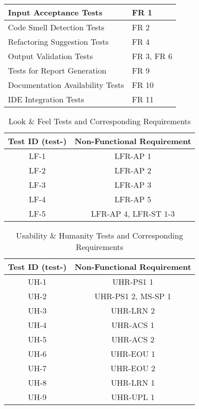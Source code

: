 \documentclass[12pt, titlepage]{article}
\begin{document}
\begin{enumerate}[label={\bf \textcolor{Maroon}{test-SRT-\arabic*}}, wide=0pt, font=\itshape]
\begin{table}[H]
\begin{tabular}{|p{}|p{}|}
    \midrule
    Input Acceptance Tests & FR 1 \\ \hline
    Code Smell Detection Tests & FR 2 \\ \hline
    Refactoring Suggestion Tests & FR 4 \\ \hline
    Output Validation Tests & FR 3, FR 6 \\ \hline
    Tests for Report Generation & FR 9 \\ \hline
    Documentation Availability Tests & FR 10 \\ \hline
    IDE Integration Tests & FR 11 \\
    \bottomrule
  \end{tabular}
  \label{tab:sections_requirements}
\end{table}

\label{tab:nfr-trace-reqs}
\begin{table}[H]
  \centering
  \caption{Look \& Feel Tests and Corresponding Requirements}
  \begin{tabular}{|c|c|}
    \toprule \textbf{Test ID (test-)} & \textbf{Non-Functional Requirement} \\
    \midrule
    LF-1 & LFR-AP 1 \\ 
    LF-2 & LFR-AP 2 \\ 
    LF-3 & LFR-AP 3 \\ 
    LF-4 & LFR-AP 5 \\ 
    LF-5 & LFR-AP 4, LFR-ST 1-3 \\
    \bottomrule
  \end{tabular}
\end{table}

\begin{table}[H]
  \centering
  \caption{Usability \& Humanity Tests and Corresponding Requirements}
  \begin{tabular}{|c|c|}
    \toprule \textbf{Test ID (test-)} & \textbf{Non-Functional Requirement} \\
    \midrule
    UH-1 & UHR-PS1 1 \\ 
    UH-2 & UHR-PS1 2, MS-SP 1 \\ 
    UH-3 & UHR-LRN 2 \\ 
    UH-4 & UHR-ACS 1 \\ 
    UH-5 & UHR-ACS 2 \\ 
    UH-6 & UHR-EOU 1 \\ 
    UH-7 & UHR-EOU 2 \\ 
    UH-8 & UHR-LRN 1 \\ 
    UH-9 & UHR-UPL 1 \\ 
    \bottomrule
  \end{tabular}
\end{table}


\end{enumerate}
\end{document}
